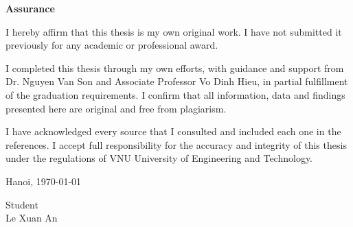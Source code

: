 \setcounter{page}{1}
\begin{center}
\textbf{\large{Assurance}}
\end{center}

I hereby affirm that this thesis is my own original work. I have not submitted it previously for any academic or professional award.

I completed this thesis through my own efforts, with guidance and support from Dr. Nguyen Van Son and Associate Professor Vo Dinh Hieu, in partial fulfillment of the graduation requirements. I confirm that all information, data and findings presented here are original and free from plagiarism.

I have acknowledged every source that I consulted and included each one in the references. I accept full responsibility for the accuracy and integrity of this thesis under the regulations of VNU University of Engineering and Technology.

\begin{flushright}
Hanoi, \today
\end{flushright}

\begin{flushright}
Student\\[2cm]
Le Xuan An
\end{flushright}
